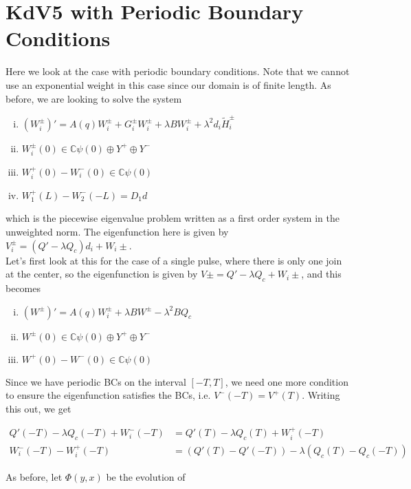\documentclass[12pt]{article}
\def\C{{\mathbb C}}
\begin{document}
\section*{KdV5 with Periodic Boundary Conditions}

Here we look at the case with periodic boundary conditions. Note that we cannot use an exponential weight in this case since our domain is of finite length. As before, we are looking to solve the system

\begin{enumerate}[(i)]
\item $(W_i^\pm)' = A(q) W_i^\pm + G_i^\pm W_i^\pm + \lambda B W_i^\pm + \lambda^2 d_i \tilde{H}_i^\pm$
\item $W_i^\pm(0) \in \C \psi(0) \oplus Y^+ \oplus Y^-$
\item $W_i^+(0) - W_i^-(0) \in \C \psi(0) $
\item $W_1^+(L) - W_2^-(-L) = D_1 d $
\end{enumerate}

which is the piecewise eigenvalue problem written as a first order system in the unweighted norm. The eigenfunction here is given by $V_i^\pm = (Q' - \lambda Q_c)d_i + W_i\pm$.\\

Let's first look at this for the case of a single pulse, where there is only one join at the center, so the eigenfunction is given by $V\pm = Q' - \lambda Q_c + W_i\pm$, and this becomes

\begin{enumerate}[(i)]
\item $(W^\pm)' = A(q) W_i^\pm + \lambda B W^\pm - \lambda^2 B Q_c$
\item $W^\pm(0) \in \C \psi(0) \oplus Y^+ \oplus Y^-$
\item $W^+(0) - W^-(0) \in \C \psi(0) $
\end{enumerate}

Since we have periodic BCs on the interval $[-T, T]$, we need one more condition to ensure the eigenfunction satisfies the BCs, i.e. $V^-(-T) = V^+(T)$. Writing this out, we get

\begin{align*}
Q'(-T) - \lambda Q_c(-T) + W_i^-(-T) &= Q'(T) - \lambda Q_c(T) + W_i^+(-T) \\
W_i^-(-T) - W_i^+(-T) &= ( Q'(T) - Q'(-T) ) - \lambda( Q_c(T) - Q_c(-T) )
\end{align*}

As before, let $\Phi(y, x)$ be the evolution of
\end{document}
